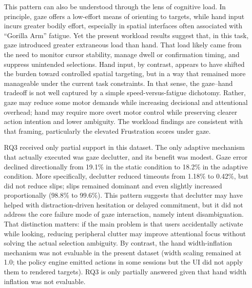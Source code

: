 \documentclass[
  11pt,
  11pt,
  letterpaper]{article}
\begin{document}
This pattern can also be understood through the lens of cognitive load.
In principle, gaze offers a low-effort means of orienting to targets,
while hand input incurs greater bodily effort, especially in spatial
interfaces often associated with ``Gorilla Arm'' fatigue. Yet the
present workload results suggest that, in this task, gaze introduced
greater extraneous load than hand. That load likely came from the need
to monitor cursor stability, manage dwell or confirmation timing, and
suppress unintended selections. Hand input, by contrast, appears to have
shifted the burden toward controlled spatial targeting, but in a way
that remained more manageable under the current task constraints. In
that sense, the gaze--hand tradeoff is not well captured by a simple
speed-versus-fatigue dichotomy. Rather, gaze may reduce some motor
demands while increasing decisional and attentional overhead; hand may
require more overt motor control while preserving clearer action
intention and lower ambiguity. The workload findings are consistent with
that framing, particularly the elevated Frustration scores under gaze.

RQ3 received only partial support in this dataset. The only adaptive
mechanism that actually executed was gaze declutter, and its benefit was
modest. Gaze error declined directionally from 19.1\% in the static
condition to 18.2\% in the adaptive condition. More specifically,
declutter reduced timeouts from 1.18\% to 0.42\%, but did not reduce
slips; slips remained dominant and even slightly increased
proportionally (98.8\% to 99.6\%). This pattern suggests that declutter
may have helped with distraction-driven hesitation or delayed
commitment, but it did not address the core failure mode of gaze
interaction, namely intent disambiguation. That distinction matters: if
the main problem is that users accidentally activate while looking,
reducing peripheral clutter may improve attentional focus without
solving the actual selection ambiguity. By contrast, the hand
width-inflation mechanism was not evaluable in the present dataset
(width scaling remained at 1.0; the policy engine emitted actions in
some sessions but the UI did not apply them to rendered targets). RQ3 is
only partially answered given that hand width inflation was not
evaluable.
\end{document}
